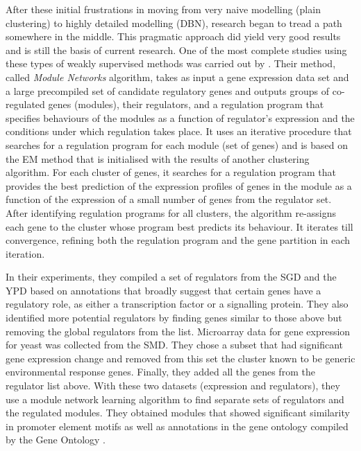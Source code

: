 After these initial frustrations in moving from very naive modelling (plain clustering) to highly detailed modelling (\acs{DBN}), research began to tread a path somewhere in the middle. This pragmatic approach did yield very good results and is still the basis of current research. One of the most complete studies using these types of weakly supervised methods was carried out by \citet{segal03module}. Their method, called \textit{Module Networks} algorithm, takes as input a gene expression data set and a large precompiled set of candidate regulatory genes and outputs groups of co-regulated genes (modules), their regulators, and a regulation program that specifies behaviours of the modules as a function of regulator's expression and the conditions under which regulation takes place. It uses an iterative procedure that searches for a regulation program for each module (set of genes) and is based on the \ac{EM} method that is initialised with the results of another clustering algorithm. For each cluster of genes, it searches for a regulation program that provides the best prediction of the expression profiles of genes in the module as a function of the expression of a small number of genes from the regulator set. After identifying regulation programs for all clusters, the algorithm re-assigns each gene to the cluster whose program best predicts its behaviour. It iterates till convergence, refining both the regulation program and the gene partition in each iteration. 

In their experiments, they compiled a set of regulators from the \ac{SGD} \citep{cherry98sgd} and the \ac{YPD} \citep{payne98ypd} based on annotations that broadly suggest that certain genes have a regulatory role, as either a transcription factor or a signalling protein. They also identified more potential regulators by finding genes similar to those above but removing the global regulators from the list. Microarray data for gene expression for yeast was collected from the \ac{SMD}. They chose a subset that had significant gene expression change and removed from this set the cluster known to be generic environmental response genes. Finally, they added all the genes from the regulator list above. With these two datasets (expression and regulators), they use a module network learning algorithm \citep{segal05learning} to find separate sets of regulators and the regulated modules. They obtained modules that showed significant similarity in promoter element motifs as well as annotations in the gene ontology compiled by the Gene Ontology \citet{GO}. 


